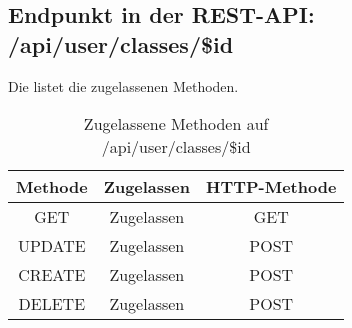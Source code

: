 \subsection{Endpunkt in der REST-API: /api/user/classes/\$id}
Die  listet die zugelassenen Methoden. 

\begin{table}[!htbp]
	\begin{tabular}{|c|c|c|}
		\hline
			\textbf{Methode} & \textbf{Zugelassen} & \textbf{HTTP-Methode} \\ \hline
			GET & Zugelassen & GET \\ \hline
			UPDATE & Zugelassen & POST \\ \hline 
			CREATE & Zugelassen & POST \\ \hline 
			DELETE & Zugelassen & POST \\ \hline
	\end{tabular}

		\caption{Zugelassene Methoden auf /api/user/classes/\$id}
		\label{tab:end:rest:api:user:classes:id:meth}
\end{table}